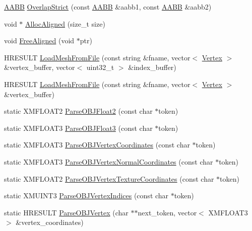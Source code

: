 \begin{DoxyCompactItemize}
\item 
\hyperlink{structmage_1_1_a_a_b_b}{A\+A\+BB} \hyperlink{namespacemage_a47de3c8ef21f996ee234f83bb51b12e5}{Overlap\+Strict} (const \hyperlink{structmage_1_1_a_a_b_b}{A\+A\+BB} \&aabb1, const \hyperlink{structmage_1_1_a_a_b_b}{A\+A\+BB} \&aabb2)
\item 
void $\ast$ \hyperlink{namespacemage_a6c97f75df305a5e0a945e82a26e75c38}{Alloc\+Aligned} (size\+\_\+t size)
\item 
void \hyperlink{namespacemage_a401c54df21447c491c527735647b5f80}{Free\+Aligned} (void $\ast$ptr)
\item 
H\+R\+E\+S\+U\+LT \hyperlink{namespacemage_a17793ae4db8f6a180f6ccf6d02ea11f8}{Load\+Mesh\+From\+File} (const string \&fname, vector$<$ \hyperlink{structmage_1_1_vertex}{Vertex} $>$ \&vertex\+\_\+buffer, vector$<$ uint32\+\_\+t $>$ \&index\+\_\+buffer)
\item 
H\+R\+E\+S\+U\+LT \hyperlink{namespacemage_afa50ab2f1511655bc88a08cc18de3e56}{Load\+Mesh\+From\+File} (const string \&fname, vector$<$ \hyperlink{structmage_1_1_vertex}{Vertex} $>$ \&vertex\+\_\+buffer)
\item 
static X\+M\+F\+L\+O\+A\+T2 \hyperlink{namespacemage_a67f3c57c7dcc1ad50c7a8f5167d50b64}{Parse\+O\+B\+J\+Float2} (const char $\ast$token)
\item 
static X\+M\+F\+L\+O\+A\+T3 \hyperlink{namespacemage_a926f2772c637d2b5c839a936cd8dbdd1}{Parse\+O\+B\+J\+Float3} (const char $\ast$token)
\item 
static X\+M\+F\+L\+O\+A\+T3 \hyperlink{namespacemage_a694cf999c8539cfcd6afbb31fb2d27cd}{Parse\+O\+B\+J\+Vertex\+Coordinates} (const char $\ast$token)
\item 
static X\+M\+F\+L\+O\+A\+T3 \hyperlink{namespacemage_a1c9ffc0af89d5d85505557864525e617}{Parse\+O\+B\+J\+Vertex\+Normal\+Coordinates} (const char $\ast$token)
\item 
static X\+M\+F\+L\+O\+A\+T2 \hyperlink{namespacemage_a97780c7deeb5a5923b0d6665732e132d}{Parse\+O\+B\+J\+Vertex\+Texture\+Coordinates} (const char $\ast$token)
\item 
static X\+M\+U\+I\+N\+T3 \hyperlink{namespacemage_afe94a043cb3be4de3549098b7ad7a326}{Parse\+O\+B\+J\+Vertex\+Indices} (const char $\ast$token)
\item 
static H\+R\+E\+S\+U\+LT \hyperlink{namespacemage_a564204c30bfe0ead7f0b4f3c76cefa2d}{Parse\+O\+B\+J\+Vertex} (char $\ast$$\ast$next\+\_\+token, vector$<$ X\+M\+F\+L\+O\+A\+T3 $>$ \&vertex\+\_\+coordinates)
\item 
$$
\end{DoxyCompactItemize}
